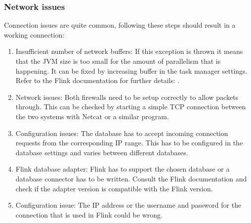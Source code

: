 \subsubsection{Network issues}
\label{mdfCorrectNetwork}
Connection issues are quite common, following these steps should result in a working connection:
\begin{enumerate}
  \item Insufficient number of network buffers: If this exception is thrown it means that the JVM size is too small for the amount of parallelism that is happening. It can be fixed by increasing buffer in the task manager settings. Refer to the Flink documentation for further details: \cite{ApacheFlink}.
  \item Network issues: Both firewalls need to be setup correctly to allow packets through. This can be checked by starting a simple TCP connection between the two systems with Netcat or a similar program.
  \item Configuration issues: The database has to accept incoming connection requests from the corresponding IP range. This has to be configured in the database settings and varies between different databases.
  \item Flink database adapter: Flink has to support the chosen database or a database connector has to be written. Consult the Flink documentation and check if the adapter version is compatible with the Flink version.
  \item Configuration issue: The IP address or the username and password for the connection that is used in Flink could be wrong.
\end{enumerate}

